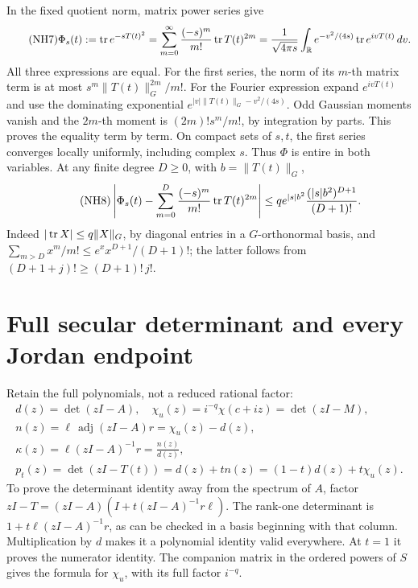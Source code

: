 In the fixed quotient norm, matrix power series give
\begin{equation}\tag{NH7}\label{nhp:NH7}
\Phi_s(t):=\operatorname{tr} e^{-sT(t)^2}
=\sum_{m=0}^\infty\frac{(-s)^m}{m!}\operatorname{tr} T(t)^{2m}
=\frac1{\sqrt{4\pi s}}\int_\mathbb R
e^{-v^2/(4s)}\operatorname{tr} e^{ivT(t)}\,dv .
\end{equation}
All three expressions are equal. For the first series,
the norm of its \(m\)-th matrix term is at most
 \(s^m\|T(t)\|_G^{2m}/m!\).
For the Fourier expression expand \(e^{ivT(t)}\) and
use the dominating exponential
\(e^{|v|\|T(t)\|_G-v^2/(4s)}\).
Odd Gaussian moments vanish and the \(2m\)-th moment is
\((2m)!s^m/m!\), by integration by parts. This proves
the equality term by term. On compact sets of \(s,t\),
the first series converges locally uniformly, including
complex \(s\). Thus \(\Phi\) is entire in both variables.
At any finite degree \(D\ge0\), with \(b=\|T(t)\|_G\),
\begin{equation}\tag{NH8}\label{nhp:NH8}
\left|\Phi_s(t)-\sum_{m=0}^D
\frac{(-s)^m}{m!}\operatorname{tr} T(t)^{2m}\right|
\le q e^{|s|b^2}\frac{(|s|b^2)^{D+1}}{(D+1)!}.
\end{equation}
Indeed \(|\operatorname{tr} X|\le q\|X\|_G\), by diagonal entries in
a \(G\)-orthonormal basis, and
\(\sum_{m>D}x^m/m!\le e^x x^{D+1}/(D+1)!\);
the latter follows from
\((D+1+j)!\ge(D+1)!\,j!\).

\section{Full secular determinant and every Jordan endpoint}

Retain the full polynomials, not a reduced rational factor:
\begin{equation}\tag{NH9}\label{nhp:NH9}
\begin{gathered}
d(z)=\det(zI-A),\quad
\chi_u(z)=i^{-q}\chi(c+iz)=\det(zI-M),\\
n(z)=\ell\,\operatorname{adj}(zI-A)r=\chi_u(z)-d(z),\\
\kappa(z)=\ell(zI-A)^{-1}r=\frac{n(z)}{d(z)},\\
p_t(z)=\det(zI-T(t))=d(z)+tn(z)=(1-t)d(z)+t\chi_u(z).
\end{gathered}
\end{equation}
To prove the determinant identity away from the spectrum
of \(A\), factor \(zI-T=(zI-A)(I+t(zI-A)^{-1}r\ell)\).
The rank-one determinant is \(1+t\ell(zI-A)^{-1}r\),
as can be checked in a basis beginning with that column.
Multiplication by \(d\) makes it a polynomial identity
valid everywhere. At \(t=1\) it proves the numerator
identity. The companion matrix in the ordered powers of
\(S\) gives the formula for \(\chi_u\), with its full
factor \(i^{-q}\).

